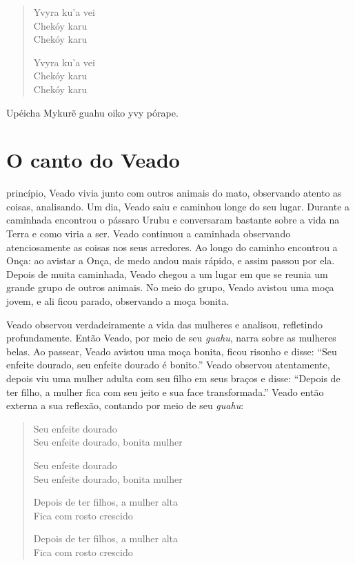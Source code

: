 \begin{verse}
Yvyra ku'a vei\\
Chekóy karu\\
Chekóy karu

Yvyra ku'a vei\\
Chekóy karu\\
Chekóy karu
\end{verse}
Upéicha Mykurẽ guahu oiko yvy pórape.


\chapter{O canto do Veado}

 princípio, Veado vivia junto com outros animais do mato, observando
atento as coisas, analisando. Um dia, Veado saiu e caminhou longe do seu
lugar. Durante a caminhada encontrou o pássaro Urubu e conversaram
bastante sobre a vida na Terra e como viria a ser. Veado continuou a
caminhada observando atenciosamente as coisas nos seus arredores. Ao
longo do caminho encontrou a Onça: ao avistar a Onça, de medo andou mais
rápido, e assim passou por ela. Depois de muita caminhada, Veado chegou
a um lugar em que se reunia um grande grupo de outros animais. No meio
do grupo, Veado avistou uma moça jovem, e ali ficou parado, observando a
moça bonita.

Veado observou verdadeiramente a vida das mulheres e analisou,
refletindo profundamente. Então Veado, por meio de seu \textit{guahu},
narra sobre as mulheres belas. Ao passear, Veado avistou uma moça
bonita, ficou risonho e disse: ``Seu enfeite dourado, seu enfeite
dourado é bonito.'' Veado observou atentamente, depois viu uma mulher
adulta com seu filho em seus braços e disse: ``Depois de ter filho, a
mulher fica com seu jeito e sua face transformada.'' Veado então externa
a sua reflexão, contando por meio de seu \textit{guahu}:

\begin{verse}
Seu enfeite dourado\\
Seu enfeite dourado, bonita mulher

Seu enfeite dourado\\
Seu enfeite dourado, bonita mulher

\pagebreak
Depois de ter filhos, a mulher alta\\
Fica com rosto crescido

Depois de ter filhos, a mulher alta\\
Fica com rosto crescido
\end{verse}


